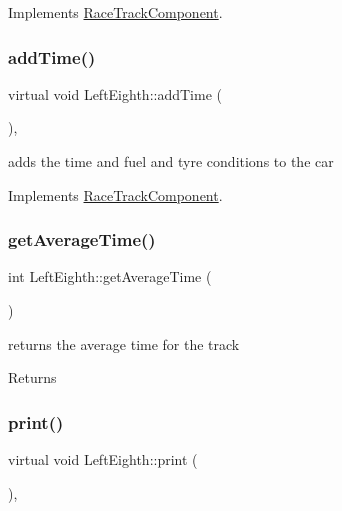 Implements \mbox{\hyperlink{class_race_track_component_af89a6b453dfd3fb39fce27576012106f}{Race\+Track\+Component}}.

\mbox{\label{class_left_eighth_a2bbed3b19b9d9842c7aadebd048b1884}} 
\subsubsection{\texorpdfstring{add\+Time()}{addTime()}}
{\footnotesize\ttfamily virtual void Left\+Eighth\+::add\+Time (\begin{DoxyParamCaption}{ }\end{DoxyParamCaption})\hspace{0.3cm}{\ttfamily [inline]}, {\ttfamily [virtual]}}

adds the time and fuel and tyre conditions to the car 

Implements \mbox{\hyperlink{class_race_track_component_aa815404c45ba7df3786c3add177eb7e6}{Race\+Track\+Component}}.

\mbox{\label{class_left_eighth_a88a09e74c3c2b3246310931a58d133f5}} 
\subsubsection{\texorpdfstring{get\+Average\+Time()}{getAverageTime()}}
{\footnotesize\ttfamily int Left\+Eighth\+::get\+Average\+Time (\begin{DoxyParamCaption}{ }\end{DoxyParamCaption})\hspace{0.3cm}{\ttfamily [inline]}}

returns the average time for the track \begin{DoxyReturn}{Returns}

\end{DoxyReturn}
\mbox{\label{class_left_eighth_ae5167cfc8af05a977d751cd0838ea17e}} 
\subsubsection{\texorpdfstring{print()}{print()}}
{\footnotesize\ttfamily virtual void Left\+Eighth\+::print (\begin{DoxyParamCaption}{ }\end{DoxyParamCaption})\hspace{0.3cm}{\ttfamily [inline]}, {\ttfamily [virtual]}}

